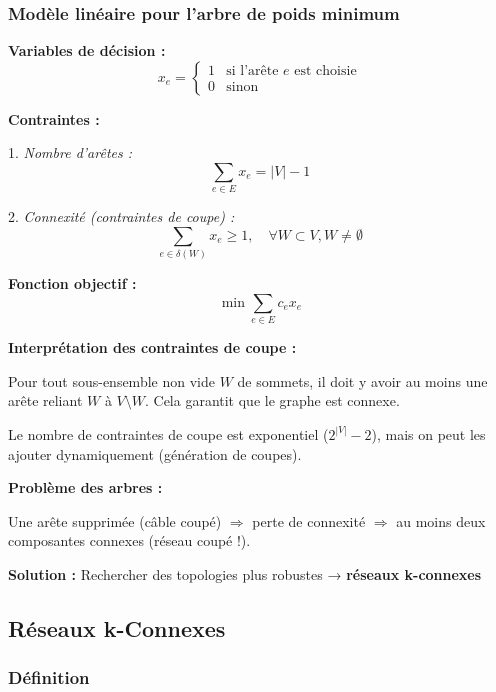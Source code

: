 \documentclass[12pt,a4paper]{article}
\begin{document}
\subsubsection{Modèle linéaire pour l'arbre de poids minimum}

\begin{definition}
\textbf{Variables de décision :}
$$x_e = \begin{cases}
1 & \text{si l'arête } e \text{ est choisie}\\
0 & \text{sinon}
\end{cases}$$

\textbf{Contraintes :}

1. \textit{Nombre d'arêtes :}
$$\sum_{e \in E} x_e = |V| - 1$$

2. \textit{Connexité (contraintes de coupe) :}
$$\sum_{e \in \delta(W)} x_e \geq 1, \quad \forall W \subset V, W \neq \emptyset$$

\textbf{Fonction objectif :}
$$\min \sum_{e \in E} c_e x_e$$
\end{definition}

\begin{notecours}
\textbf{Interprétation des contraintes de coupe :}

Pour tout sous-ensemble non vide $W$ de sommets, il doit y avoir au moins une arête reliant $W$ à $V \setminus W$. Cela garantit que le graphe est connexe.

Le nombre de contraintes de coupe est exponentiel ($2^{|V|} - 2$), mais on peut les ajouter dynamiquement (génération de coupes).
\end{notecours}

\begin{important}
\textbf{Problème des arbres :}

Une arête supprimée (câble coupé) $\Rightarrow$ perte de connexité $\Rightarrow$ au moins deux composantes connexes (réseau coupé !).

\textbf{Solution :} Rechercher des topologies plus robustes → \textcolor{importantrouge}{\textbf{réseaux k-connexes}}
\end{important}

\newpage
\subsection{Réseaux k-Connexes}

\subsubsection{Définition}
\end{document}
